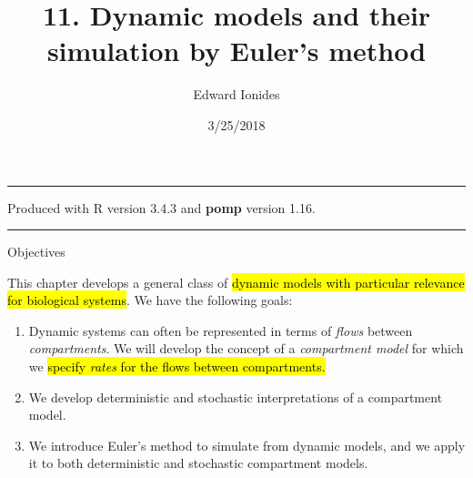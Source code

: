 \documentclass[]{article}
\title{11. Dynamic models and their simulation by Euler's method}
\author{Edward Ionides}
\date{3/25/2018}
\begin{document}
\maketitle

{
\setcounter{tocdepth}{2}
\tableofcontents
}
\newcommand\prob{\mathbb{P}}
\newcommand\E{\mathbb{E}}
\newcommand\cov{\mathrm{Cov}}
\newcommand\loglik{\ell}
\newcommand\R{\mathbb{R}}
\newcommand\data[1]{#1^*}
\newcommand\params{\, ; \,}
\newcommand\transpose{\scriptsize{T}}
\newcommand\eqspace{\quad\quad}
\newcommand\myeq[1]{\eqspace \displaystyle #1}
\newcommand\lik{\mathscr{L}}
\newcommand\profileloglik[1]{\ell^\mathrm{profile}_#1}
\newcommand\ar{\phi}
\newcommand\ma{\psi}
\newcommand\AR{\Phi}
\newcommand\MA{\Psi}
\newcommand\ev{u}
\newcommand\given{{\, | \,}}
\newcommand\equals{{=\,}}
\newcommand\matA{\mathbb{A}}
\newcommand\matB{\mathbb{B}}
\newcommand\matH{\mathbb{H}}
\newcommand\covmatX{\mathbb{U}}
\newcommand\covmatY{\mathbb{V}}


\begin{center}\rule{0.5\linewidth}{\linethickness}\end{center}

\newcommand\expect[1]{\mathbb{E}\left[{#1}\right]}
\newcommand\var[1]{\mathrm{Var}\left[{#1}\right]}
\newcommand\dist[2]{\mathrm{#1}\left(#2\right)}
\newcommand\dlta{\Delta}


Produced with R version 3.4.3 and \textbf{pomp} version 1.16.

\begin{center}\rule{0.5\linewidth}{\linethickness}\end{center}

Objectives

This chapter develops a general class of \hl{dynamic models with particular
relevance for biological systems}. We have the following goals:

\begin{enumerate}
\def\labelenumi{\arabic{enumi}.}
\item
  Dynamic systems can often be represented in terms of \emph{flows}
  between \emph{compartments}. We will develop the concept of a
  \emph{compartment model} for which we \hl{specify \emph{rates} for the
  flows between compartments.}
\item
  We develop deterministic and stochastic interpretations of a
  compartment model.
\item
  We introduce Euler's method to simulate from dynamic models, and we
  apply it to both deterministic and stochastic compartment models.
\end{enumerate}
\end{document}
